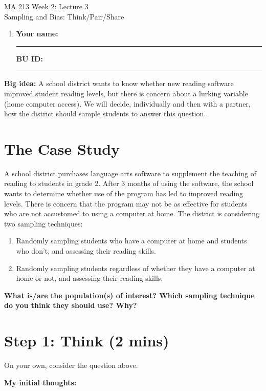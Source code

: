 \documentclass{article}
\newcommand{\coursenumber}{MA 213}
\newcommand{\weekplaceholder}{2}
\newcommand{\lectureplaceholder}{3}
\newcommand{\lecturetitle}{Sampling and Bias: Think/Pair/Share}
\newcommand{\nameblank}{\rule{1.75in}{0.4pt}}
\newcommand{\idblank}{\rule{1.55in}{0.4pt}}
\begin{document}
\begin{center}
  {\LARGE \coursenumber{} Week \weekplaceholder{}: Lecture \lectureplaceholder{}}\\
  {\large \lecturetitle{}}
\end{center}

\begin{enumerate}[label=\arabic*.,leftmargin=*,itemsep=.7em]
  \item \textbf{Your name:} \nameblank \hfill \textbf{BU ID:} \idblank
\end{enumerate}

\textbf{Big idea:} A school district wants to know whether new reading software improved student reading levels, but there is concern about a lurking variable (home computer access). We will decide, individually and then with a partner, how the district should sample students to answer this question.

\section*{The Case Study}

A school district purchases language arts software to supplement the teaching of reading to students in grade 2. After 3 months of using the software, the school wants to determine whether use of the program has led to improved reading levels. There is concern that the program may not be as effective for students who are not accustomed to using a computer at home. The district is considering two sampling techniques:

\begin{enumerate}
  \item Randomly sampling students who have a computer at home and students who don't, and assessing their reading skills.
  \item Randomly sampling students regardless of whether they have a computer at home or not, and assessing their reading skills.
\end{enumerate}

\textbf{What is/are the population(s) of interest? Which sampling technique do you think they should use? Why?}

\section*{Step 1: Think (2 mins)}

On your own, consider the question above.

\textbf{My initial thoughts:}
\vfill
\newpage
\end{document}
